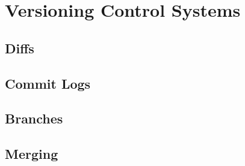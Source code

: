 \section{Versioning Control Systems}

\subsection{Diffs}

\subsection{Commit Logs}

\subsection{Branches}

\subsection{Merging}


